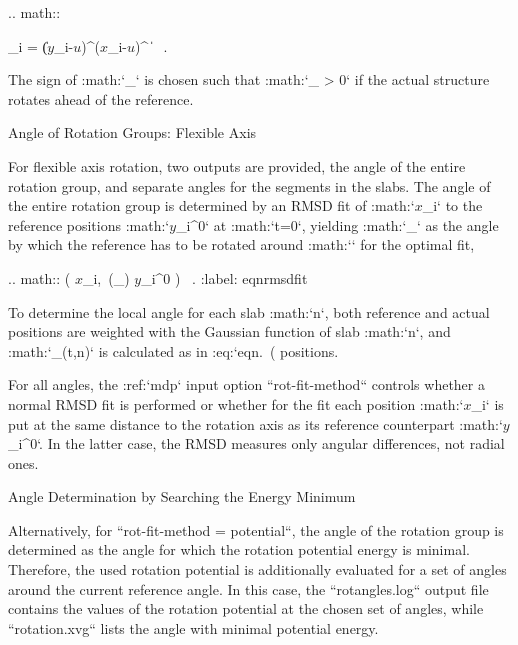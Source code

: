 .. math::

   \cos \theta_i = 
        { \| ({\mbox{\boldmath ${y}$}}_i-{\mbox{\boldmath ${u}$}})^\perp \cdot ({\mbox{\boldmath ${x}$}}_i-{\mbox{\boldmath ${u}$}})^\perp
        \| } \ .

The sign of :math:`\theta_` is chosen such that
:math:`\theta_ > 0` if the actual structure rotates ahead of
the reference.

Angle of Rotation Groups: Flexible Axis
^^^^^^^^^^^^^^^^^^^^^^^^^^^^^^^^^^^^^^^

For flexible axis rotation, two outputs are provided, the angle of the
entire rotation group, and separate angles for the segments in the
slabs. The angle of the entire rotation group is determined by an RMSD
fit of :math:`{\mbox{\boldmath ${x}$}}_i` to the reference positions
:math:`{\mbox{\boldmath ${y}$}}_i^0` at :math:`t=0`, yielding
:math:`\theta_` as the angle by which the reference has to
be rotated around :math:`` for the optimal
fit,

.. math::   \big( {\mbox{\boldmath ${x}$}}_i,\ \mathbf{\Omega}(\theta_)
           {\mbox{\boldmath ${y}$}}_i^0 \big) \stackrel{!}{=}  \, .
           :label: eqnrmsdfit

To determine the local angle for each slab :math:`n`, both reference
and actual positions are weighted with the Gaussian function of slab
:math:`n`, and :math:`\theta_(t,n)` is calculated as in
:eq:`eqn. (%
positions.

For all angles, the :ref:`mdp` input option
``rot-fit-method`` controls whether a normal RMSD fit is
performed or whether for the fit each position
:math:`{\mbox{\boldmath ${x}$}}_i` is put at the same distance to the
rotation axis as its reference counterpart
:math:`{\mbox{\boldmath ${y}$}}_i^0`. In the latter case, the RMSD
measures only angular differences, not radial ones.

Angle Determination by Searching the Energy Minimum
^^^^^^^^^^^^^^^^^^^^^^^^^^^^^^^^^^^^^^^^^^^^^^^^^^^

Alternatively, for ``rot-fit-method = potential``, the angle
of the rotation group is determined as the angle for which the rotation
potential energy is minimal. Therefore, the used rotation potential is
additionally evaluated for a set of angles around the current reference
angle. In this case, the ``rotangles.log`` output file
contains the values of the rotation potential at the chosen set of
angles, while ``rotation.xvg`` lists the angle with minimal
potential energy.

